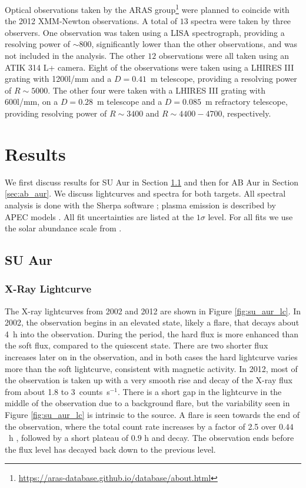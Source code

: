 \documentclass[twocolumn]{aastex631}
\begin{document}
Optical observations taken by the ARAS group\footnote{\url{https://aras-database.github.io/database/about.html}} were planned to coincide with the 2012 XMM-Newton observations. A total of $13$ spectra were taken by three observers. One observation was taken using a LISA spectrograph, providing a resolving power of $\sim800$, significantly lower than the other observations, and was not included in the analysis. The other $12$ observations were all taken using an ATIK 314 L+ camera. Eight of the observations were taken using a LHIRES III grating with 1200l/mm and a $D=0.41$~m telescope, providing a resolving power of $R\sim5000$. The other four were taken with a LHIRES III grating with 600l/mm, on a $D=0.28$~m telescope and a $D=0.085$~m refractory telescope, providing resolving power of $R\sim3400$ and $R\sim4400-4700$, respectively. 



\section{Results}\label{sec:results}
We first discuss results for SU Aur in Section \ref{sec:su_aur} and then for AB Aur in Section \ref{sec:ab_aur}. We discuss lightcurves and spectra for both targets. All spectral analysis is done with the Sherpa software \citep{burke_sherpasherpa_2024}; plasma emission is described by APEC models \citep{foster_updated_2012}. All fit uncertainties are listed at the $1\sigma$ level.  For all fits we use the solar abundance scale from \citet{asplund_chemical_2009}.

\subsection{SU Aur} \label{sec:su_aur}

\subsubsection{X-Ray Lightcurve} \label{sec:lightcurve}

The X-ray lightcurves from 2002 and 2012 are shown in Figure \ref{fig:su_aur_lc}. In 2002, the observation begins in an elevated state, likely a flare, that decays about 4~h into the observation. During the period, the hard flux is more enhanced than the soft flux, compared to the quiescent state. There are two shorter flux increases later on in the observation, and in both cases the hard lightcurve varies more than the soft lightcurve, consistent with magnetic activity. In 2012, most of the observation is taken up with a very smooth rise and decay of the X-ray flux from about 1.8 to 3~counts~s$^{-1}$. There is a short gap in the lightcurve in the middle of the observation due to a background flare, but the variability seen in Figure \ref{fig:su_aur_lc} is intrinsic to the source. A flare is seen towards the end of the observation, where the total count rate increases by a factor of 2.5 over $0.44$~h , followed by a short plateau of $0.9$ h and decay. The observation ends before the flux level has decayed back down to the previous level. 
\end{document}
